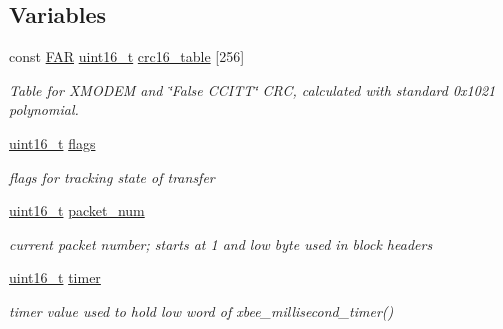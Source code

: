 \subsection*{Variables}
\begin{DoxyCompactItemize}
\item 
const \hyperlink{group__hal_gaef060b3456fdcc093a7210a762d5f2ed}{F\+AR} \hyperlink{group__hal__dos_ga5a8b2dc9e45a9ee81a94ef304fb62505}{uint16\+\_\+t} \hyperlink{group__util__xmodem_gab903230030042c3ee444aa887b705e06}{crc16\+\_\+table} \mbox{[}256\mbox{]}
\begin{DoxyCompactList}\small\item\em Table for X\+M\+O\+D\+EM and \char`\"{}\+False C\+C\+I\+T\+T\char`\"{} C\+RC, calculated with standard 0x1021 polynomial. \end{DoxyCompactList}\item 
\mbox{\label{group__util__xmodem_ga1e87af3c18a2fd36c61faf89949bdc3f}} 
\hyperlink{group__hal__dos_ga5a8b2dc9e45a9ee81a94ef304fb62505}{uint16\+\_\+t} \hyperlink{group__util__xmodem_ga1e87af3c18a2fd36c61faf89949bdc3f}{flags}
\begin{DoxyCompactList}\small\item\em flags for tracking state of transfer \end{DoxyCompactList}\item 
\mbox{\label{group__util__xmodem_ga59de4bab5575291b6b4ace70d7e50af5}} 
\hyperlink{group__hal__dos_ga5a8b2dc9e45a9ee81a94ef304fb62505}{uint16\+\_\+t} \hyperlink{group__util__xmodem_ga59de4bab5575291b6b4ace70d7e50af5}{packet\+\_\+num}
\begin{DoxyCompactList}\small\item\em current packet number; starts at 1 and low byte used in block headers \end{DoxyCompactList}\item 
\mbox{\label{group__util__xmodem_gaea00c2c1dec6e8f58532f25c65210d9e}} 
\hyperlink{group__hal__dos_ga5a8b2dc9e45a9ee81a94ef304fb62505}{uint16\+\_\+t} \hyperlink{group__util__xmodem_gaea00c2c1dec6e8f58532f25c65210d9e}{timer}
\begin{DoxyCompactList}\small\item\em timer value used to hold low word of xbee\+\_\+millisecond\+\_\+timer() \end{DoxyCompactList}\item 

\end{DoxyCompactItemize}
